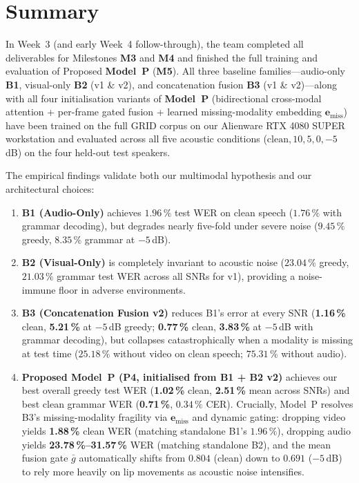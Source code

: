 \documentclass[11pt,a4paper]{article}
\begin{document}
\section{Summary}
In Week~3 (and early Week~4 follow-through), the team completed all deliverables for Milestones \textbf{M3} and \textbf{M4} and finished the full training and evaluation of Proposed \textbf{Model~P} (\textbf{M5}). All three baseline families---audio-only \textbf{B1}, visual-only \textbf{B2} (v1 \& v2), and concatenation fusion \textbf{B3} (v1 \& v2)---along with all four initialisation variants of \textbf{Model~P} (bidirectional cross-modal attention + per-frame gated fusion + learned missing-modality embedding $\mathbf{e}_{\text{miss}}$) have been trained on the full GRID corpus on our Alienware RTX 4080 SUPER workstation and evaluated across all five acoustic conditions ($\text{clean}, 10, 5, 0, -5$\,dB) on the four held-out test speakers.

The empirical findings validate both our multimodal hypothesis and our architectural choices:
\begin{enumerate}
  \item \textbf{B1 (Audio-Only)} achieves $1.96\,\%$ test WER on clean speech ($1.76\,\%$ with grammar decoding), but degrades nearly five-fold under severe noise ($9.45\,\%$ greedy, $8.35\,\%$ grammar at $-5$\,dB).
  \item \textbf{B2 (Visual-Only)} is completely invariant to acoustic noise ($23.04\,\%$ greedy, $21.03\,\%$ grammar test WER across all SNRs for v1), providing a noise-immune floor in adverse environments.
  \item \textbf{B3 (Concatenation Fusion v2)} reduces B1's error at every SNR (\textbf{1.16\,\%} clean, \textbf{5.21\,\%} at $-5$\,dB greedy; \textbf{0.77\,\%} clean, \textbf{3.83\,\%} at $-5$\,dB with grammar decoding), but collapses catastrophically when a modality is missing at test time ($25.18\,\%$ without video on clean speech; $75.31\,\%$ without audio).
  \item \textbf{Proposed Model~P (P4, initialised from B1 + B2 v2)} achieves our best overall greedy test WER (\textbf{1.02\,\%} clean, \textbf{2.51\,\%} mean across SNRs) and best clean grammar WER (\textbf{0.71\,\%}, $0.34\,\%$ CER). Crucially, Model~P resolves B3's missing-modality fragility via $\mathbf{e}_{\text{miss}}$ and dynamic gating: dropping video yields \textbf{1.88\,\%} clean WER (matching standalone B1's $1.96\,\%$), dropping audio yields \textbf{23.78\,\%--31.57\,\%} WER (matching standalone B2), and the mean fusion gate $\bar{g}$ automatically shifts from $0.804$ (clean) down to $0.691$ ($-5$\,dB) to rely more heavily on lip movements as acoustic noise intensifies.
\end{enumerate}
\end{document}
